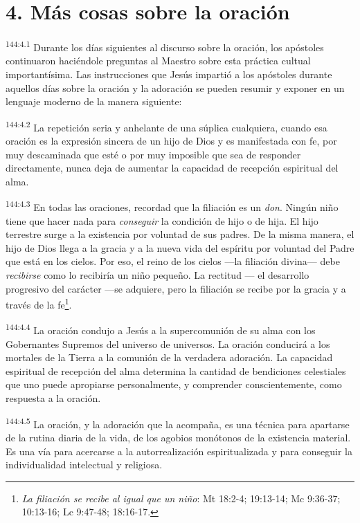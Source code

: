 \section*{4. Más cosas sobre la oración}
\par 
\textsuperscript{144:4.1} Durante los días siguientes al discurso sobre la oración, los apóstoles continuaron haciéndole preguntas al Maestro sobre esta práctica cultual importantísima. Las instrucciones que Jesús impartió a los apóstoles durante aquellos días sobre la oración y la adoración se pueden resumir y exponer en un lenguaje moderno de la manera siguiente:

\par 
\textsuperscript{144:4.2} La repetición seria y anhelante de una súplica cualquiera, cuando esa oración es la expresión sincera de un hijo de Dios y es manifestada con fe, por muy descaminada que esté o por muy imposible que sea de responder directamente, nunca deja de aumentar la capacidad de recepción espiritual del alma.

\par 
\textsuperscript{144:4.3} En todas las oraciones, recordad que la filiación es un \textit{don}. Ningún niño tiene que hacer nada para \textit{conseguir} la condición de hijo o de hija. El hijo terrestre surge a la existencia por voluntad de sus padres. De la misma manera, el hijo de Dios llega a la gracia y a la nueva vida del espíritu por voluntad del Padre que está en los cielos. Por eso, el reino de los cielos ---la filiación divina--- debe \textit{recibirse} como lo recibiría un niño pequeño. La rectitud --- el desarrollo progresivo del carácter ---se adquiere, pero la filiación se recibe por la gracia y a través de la fe\footnote{\textit{La filiación se recibe al igual que un niño}: Mt 18:2-4; 19:13-14; Mc 9:36-37; 10:13-16; Lc 9:47-48; 18:16-17.}.

\par 
\textsuperscript{144:4.4} La oración condujo a Jesús a la supercomunión de su alma con los Gobernantes Supremos del universo de universos. La oración conducirá a los mortales de la Tierra a la comunión de la verdadera adoración. La capacidad espiritual de recepción del alma determina la cantidad de bendiciones celestiales que uno puede apropiarse personalmente, y comprender conscientemente, como respuesta a la oración.

\par 
\textsuperscript{144:4.5} La oración, y la adoración que la acompaña, es una técnica para apartarse de la rutina diaria de la vida, de los agobios monótonos de la existencia material. Es una vía para acercarse a la autorrealización espiritualizada y para conseguir la individualidad intelectual y religiosa.

